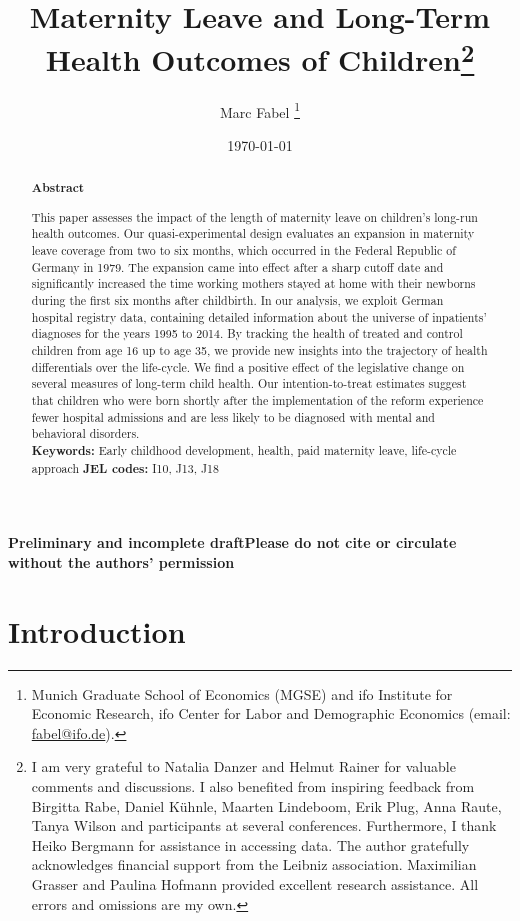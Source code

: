 \documentclass[11pt, a4paper]{article} %
\title{Maternity Leave and Long-Term Health Outcomes of Children\footnote{I am very grateful to Natalia Danzer and Helmut Rainer for valuable comments and discussions. I also benefited from inspiring feedback from Birgitta Rabe, Daniel Kühnle, Maarten Lindeboom, Erik Plug, Anna Raute, Tanya Wilson and participants at several conferences. Furthermore, I thank Heiko Bergmann for assistance in accessing data. The author gratefully acknowledges financial support from the Leibniz association. Maximilian Grasser and Paulina Hofmann provided excellent research assistance. All errors and omissions are my own.
}}
\author{
	Marc Fabel 
		\thanks{Munich Graduate School of Economics (MGSE) and ifo Institute for Economic Research, ifo Center for Labor and Demographic Economics (email: \href{mailto:fabel@ifo.de}{fabel@ifo.de}).
		}
}
\date{\monthyeardate\today}
\begin{document}
\setcounter{page}{0}  
\newpage
\setcounter{page}{1}    
\maketitle

\textbf{\color{red} Preliminary and incomplete draft\newline Please do not cite or circulate without the authors' permission}
\renewcommand{\abstractname}{\vspace{-\baselineskip}} %

  \begin{abstract}\noindent 
   \footnotesize{\begin{center}\textbf{Abstract}\end{center} This paper assesses the impact of the length of maternity leave on children’s long-run health outcomes. Our quasi-experimental design evaluates an expansion in maternity leave coverage from two to six months, which occurred in the Federal Republic of Germany in 1979. The expansion came into effect after a sharp cutoff date and significantly increased the time working mothers stayed at home with their newborns during the first six months after childbirth. In our analysis, we exploit German hospital registry data, containing detailed information about the universe of inpatients' diagnoses for the years 1995 to 2014. 
   By tracking the health of treated and control children from age 16 up to age 35, we provide new insights into the trajectory of health differentials over the life-cycle.
   We find a positive effect of the legislative change on several measures of long-term child health. Our intention-to-treat estimates suggest that children who were born shortly after the implementation of the reform experience fewer hospital admissions and are less likely to be diagnosed with mental and behavioral disorders.
   	\\\newline \textbf{Keywords:} Early childhood development, health, paid maternity leave, life-cycle approach \newline \textbf{JEL codes:} I10, J13, J18}
    \end{abstract}

\newpage


\section{Introduction}\label{sec:introduction}
\end{document}
